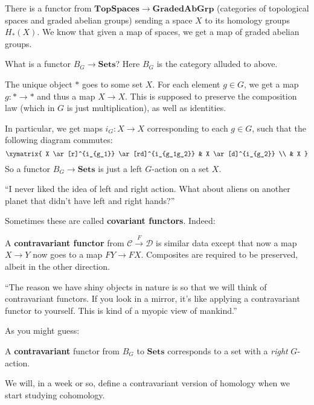 \begin{example} 
There is a functor from $\mathbf{TopSpaces} \to \mathbf{GradedAbGrp}$
(categories of topological spaces and graded abelian groups) sending a
space $X$ to its homology groups $H_*(X)$. We know that given a map of spaces,
we get a map of graded abelian groups. 
\end{example} 


\begin{example} 
What is a functor $B_G \stackrel{}{\to} \mathbf{Sets}$? Here $B_G$ is the
category alluded to above. 

The unique object $\ast$ goes to some set $X$. For each element $g \in G$, we
get a map $g: \ast \to \ast$ and thus a map $X \to X$. This is supposed to
preserve the composition law (which in $G$ is just multiplication), as well as
identities. 

In particular, we get maps $i_G: X \to X$ corresponding to each $g \in G$, such
that the following diagram commutes:
\[ \xymatrix{
X \ar[r]^{i_{g_1}} \ar[rd]^{i_{g_1g_2}} & X \ar[d]^{i_{g_2}} \\ & X 
}\]
So a functor $B_G \to \mathbf{Sets}$ is just a left $G$-action on a set $X$.
\end{example} 

``I never liked the idea of left and right action.  What about aliens on
another planet that didn't have left and right hands?''

Sometimes these are called \textbf{covariant functors}. Indeed:

\begin{definition} 
A \textbf{contravariant functor} from $\mathcal{C} \stackrel{F}{\to}\mathcal{D}$ is similar
data except that now a map $X \to Y$ now goes to a map $FY \to FX$. Composites
are required to be preserved, albeit in the other direction. 
\end{definition} 

``The reason we have shiny objects in nature is so that we will think of
contravariant functors. If you look in a mirror, it's like applying a
contravariant functor to yourself. This is kind of a myopic view of mankind.''

As you might guess:

\begin{example} 
A \textbf{contravariant} functor from $B_G$ to $\mathbf{Sets}$ corresponds to a
set with a \emph{right} $G$-action. 
\end{example} 

We will, in a week or so, define a contravariant version of homology when we
start studying cohomology.

